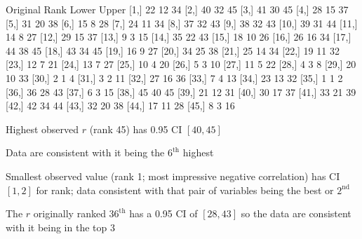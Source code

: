 \begin{Schunk}
\begin{Soutput}
      Original Rank Lower Upper
 [1,]            22    12    34
 [2,]            40    32    45
 [3,]            41    30    45
 [4,]            28    15    37
 [5,]            31    20    38
 [6,]            15     8    28
 [7,]            24    11    34
 [8,]            37    32    43
 [9,]            38    32    43
[10,]            39    31    44
[11,]            14     8    27
[12,]            29    15    37
[13,]             9     3    15
[14,]            35    22    43
[15,]            18    10    26
[16,]            26    16    34
[17,]            44    38    45
[18,]            43    34    45
[19,]            16     9    27
[20,]            34    25    38
[21,]            25    14    34
[22,]            19    11    32
[23,]            12     7    21
[24,]            13     7    27
[25,]            10     4    20
[26,]             5     3    10
[27,]            11     5    22
[28,]             4     3     8
[29,]            20    10    33
[30,]             2     1     4
[31,]             3     2    11
[32,]            27    16    36
[33,]             7     4    13
[34,]            23    13    32
[35,]             1     1     2
[36,]            36    28    43
[37,]             6     3    15
[38,]            45    40    45
[39,]            21    12    31
[40,]            30    17    37
[41,]            33    21    39
[42,]            42    34    44
[43,]            32    20    38
[44,]            17    11    28
[45,]             8     3    16
\end{Soutput}
\end{Schunk}

\item Highest observed $r$ (rank 45) has 0.95 CI $[40,45]$
\item Data are consistent with it being the $6^\textrm{th}$ highest
\item Smallest observed value (rank 1; most impressive negative
  correlation) has CI $[1, 2]$ for rank; data consistent with that
  pair of variables being the best or $2^\textrm{nd}$
\item The $r$ originally ranked $36^\textrm{th}$ has a 0.95 CI of $[28, 43]$ so the data are consistent with it being in the top 3
\ei

